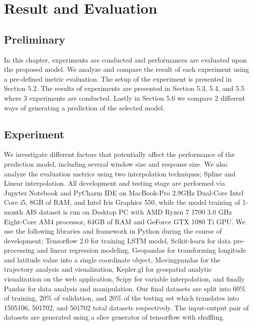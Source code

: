 
\chapter{Result and Evaluation}
\label{ch:noodle}
\vspace{2em}

\section{Preliminary}
In this chapter, experiments are conducted and performances are evaluated upon the proposed model. We analyze and compare the result of each experiment using a pre-defined metric evaluation. The setup of the experiment is presented in Section 5.2. The results of experiments are presented in Section 5.3, 5.4, and 5.5 where 3 experiments are conducted. Lastly in Section 5.6 we compare 2 different ways of generating a prediction of the selected model.

\section{Experiment}
We investigate different factors that potentially affect the performance of the prediction model, including several window size and response size. We also analyze the evaluation metrics using two interpolation techniques; Spline and Linear interpolation. All development and testing stage are performed via Jupyter Notebook and PyCharm IDE on MacBook-Pro 2.9GHz Dual-Core Intel Core i5, 8GB of RAM, and Intel Iris Graphics 550,  while the model training of 1-month AIS dataset is run on Desktop PC with AMD Ryzen 7 1700 3.0 GHz Eight-Core AM4 processor, 64GB of RAM and GeForce GTX 1080 Ti GPU. We use the following libraries and framework in Python during the course of development; Tensorflow 2.0 for training LSTM model, Scikit-learn for data pre-processing and linear regression modeling, Geopandas for transforming longitude and latitude value into a single coordinate object, Movingpandas for the trajectory analysis and visualization, Kepler.gl for geospatial analytic visualization on the web application, Scipy for variable interpolation, and finally Pandas for data analysis and manipulation. Our final datasets are split into 60\% of training, 20\% of validation, and 20\% of the testing set which translates into 1505106, 501702, and 501702 total datasets respectively. The input-output pair of datasets are generated using a slice generator of tensorflow with shuffling.

